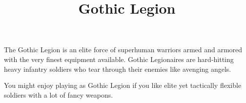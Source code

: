








\title{Gothic Legion}

\maketitle

The Gothic Legion is an elite force of superhuman warriors armed and armored with the very finest equipment available. Gothic Legionaires are hard-hitting heavy infantry soldiers who tear through their enemies like avenging angels.

You might enjoy playing as Gothic Legion if you like elite yet tactically flexible soldiers with a lot of fancy weapons.







\newcommand{\CombatKnife}[1][4+]{\textbf{Combat Knife}: {#1} D1}
\newcommand{\DemoCharges}[1][4+]{\textbf{Demo Charges}: {#1} D6 [Critical 9+, Deadly D5+2, Slow, Unstable 1, May only be used against Vehicle or Monster models]}
\newcommand{\EnergyFist}[1][5+]{\textbf{Energy Fist}: {#1} D6 [Deadly 4]}
\newcommand{\EnergyFistLeader}[1][4+]{\textbf{Energy Fist}: {#1} D6 [Deadly 4, Rapid 2]}
\newcommand{\EnergySword}[1][4+]{\textbf{Energy Sword}: {#1} D6 [Deadly 2, Rapid 2]}
\newcommand{\EnergySwordLeader}[1][3+]{\textbf{Energy Sword}: {#1} D6 [Deadly 2, Rapid 3]}
\newcommand{\Sword}[1][4+]{\textbf{Sword}: {#1} D2 Rapid 2}






\newcommand{\CrushingTracks}[1][9+]{\textbf{Crushing Tracks}: {#1} D8 [Deadly 4, Rapid 2]}
\newcommand{\HeavyEnergyFist}[1][4+]{\textbf{Heavy Energy Fist}: {#1} D7 [Deadly 5, Rapid 3]}
\newcommand{\Ram}[1][7+]{\textbf{Ram}: {#1} D4 [Deadly 4]}


\newcommand{\PlasmaRifle}[1][4+]{\textbf{Plasma Rifle}: R20 {#1} D6, [Deadly 2, Unstable 1]}
\newcommand{\PlasmaPistol}[1][4+]{\textbf{Plasma Pistol}: R10 {#1} D6, [Deadly 2, Unstable 1]}
\newcommand{\BattlePistol}[1][4+]{\textbf{Battle Pistol}: R10 {#1} D2}
\newcommand{\BattleRifle}[1][4+]{\textbf{Battle Rifle}: R20 {#1} D2}

